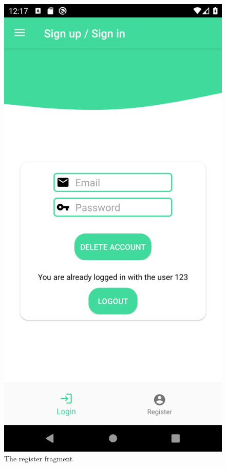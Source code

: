\begin{figure}[H]
    \centering
    \includegraphics[scale=0.12]{_figures/logout_fragment.png}
    \caption{The register fragment}
\end{figure}


